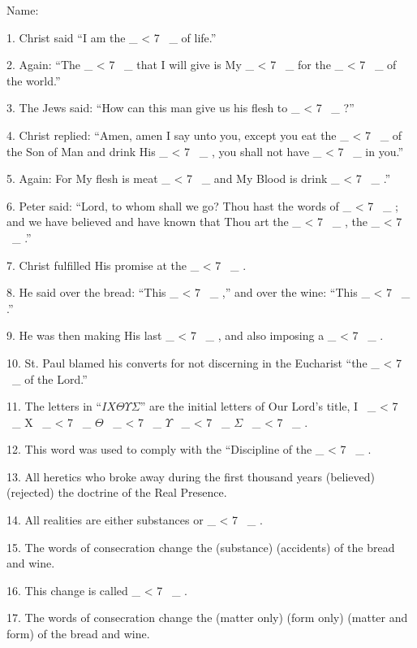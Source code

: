 \documentclass[a5paper]{article}
\title{}
\newcommand\textjarman[1]{{\jarman #1}}
\newcounter{z}
\newcommand\spaces[1]{ \_\loop \ifnum\value{z} < #1
~\_%
\stepcounter{z}%
\repeat%
\setcounter{z}{0}}
\begin{document}
\setlength{\parskip}{6pt plus2pt minus2pt}


\noindent Name:




1. Christ said “I am the \spaces{7} of life.” 

2. Again: “The \spaces{7}  that  I
will give is My \spaces{7} for the \spaces{7} of the world.” 

3. The  Jews  said:
“How can this man give us his flesh to \spaces{7}?” 

4. Christ replied:  “Amen,
amen I say unto you, except you eat the \spaces{7}  of  the  Son  of  Man  and
drink His \spaces{7}, you shall not have \spaces{7} in you.” 

5.  Again:  For  My
flesh is meat \spaces{7} and My Blood  is  drink  \spaces{7}.”  

6.  Peter  said:
“Lord, to whom shall we go? Thou hast the words of  \spaces{7};  and  we  have
believed and have known that  Thou  art  the  \spaces{7},  the  \spaces{7}.” 

7. 
Christ fulfilled His promise at the \spaces{7}. 

8. He  said  over  the  bread:
“This \spaces{7},” and over the wine: “This \spaces{7}.” 

9. He was  then  making
His last \spaces{7}, and also imposing a \spaces{7}. 

10.  St.  Paul  blamed  his
converts for not discerning in the Eucharist “the  \spaces{7}  of  the  Lord.”


11. The letters in “$IX\Theta\Upsilon\Sigma$” are the initial letters  of  Our  Lord's  title,
I~\spaces{7} X~\spaces{7} $\Theta$~\spaces{7} $\Upsilon$~\spaces{7} $\Sigma$~\spaces{7} . 

12. This word was used to  comply  with  the  “Discipline  of  the
\spaces{7}. 

13. All heretics who broke away during the  first  thousand  years
(\textjarman{believed}) (\textjarman{rejected}) the doctrine of the Real Presence. 

14.  All  realities
are either substances or \spaces{7}. 

15. The words of consecration change  the
(\textjarman{substance}) (\textjarman{accidents}) of the bread and wine. 

16.  This  change  is  called
\spaces{7}. 

17. The words of  consecration  change  the  (\textjarman{matter  only})  (\textjarman{form
only}) (\textjarman{matter and form}) of the  bread  and  wine.  
\end{document}
